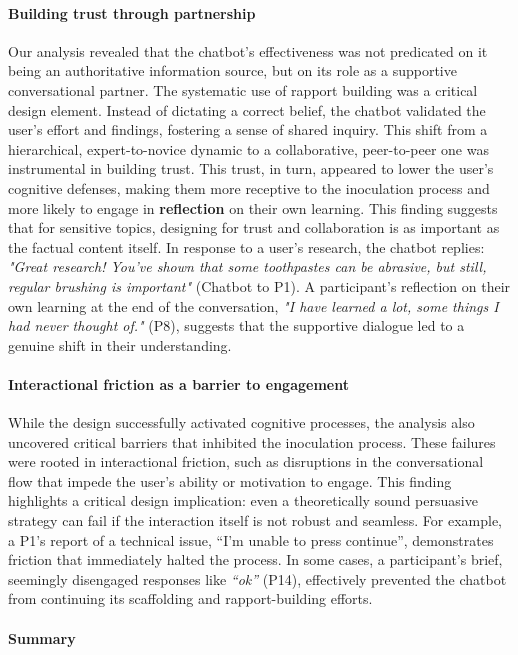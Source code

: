 \documentclass[sigconf]{acmart}
\begin{document}
\paragraph{Building trust through partnership}
Our analysis revealed that the chatbot's effectiveness was not predicated on it being an authoritative information source, but on its role as a supportive conversational partner. The systematic use of rapport building was a critical design element. Instead of dictating a correct belief, the chatbot validated the user's effort and findings, fostering a sense of shared inquiry. This shift from a hierarchical, expert-to-novice dynamic to a collaborative, peer-to-peer one was instrumental in building trust. This trust, in turn, appeared to lower the user's cognitive defenses, making them more receptive to the inoculation process and more likely to engage in \textbf{reflection} on their own learning. This finding suggests that for sensitive  topics, designing for trust and collaboration is as important as the factual content itself. In response to a user’s research, the chatbot replies: \textit{"Great research! You've shown that some toothpastes can be abrasive, but still, regular brushing is important"} (Chatbot to P1). A participant’s reflection on their own learning at the end of the conversation, \textit{"I have learned a lot, some things I had never thought of."} (P8), suggests that the supportive dialogue led to a genuine shift in their understanding.

\paragraph{Interactional friction as a barrier to engagement}
While the design successfully activated cognitive processes, the analysis also uncovered critical barriers that inhibited the inoculation process. These failures were rooted in interactional friction, such as disruptions in the conversational flow that impede the user's ability or motivation to engage. This finding highlights a critical design implication: even a theoretically sound persuasive strategy can fail if the interaction itself is not robust and seamless. For example, a P1's report of a technical issue, “I'm unable to press continue”, demonstrates friction that immediately halted the process. In some cases, a participant’s brief, seemingly disengaged responses like \textit{“ok”} (P14), effectively prevented the chatbot from continuing its scaffolding and rapport-building efforts.

\paragraph{Summary}
\end{document}
